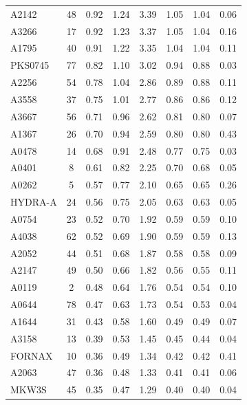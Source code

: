 \documentclass[10pt,aps,pra,reprint,amsmath,amsfonts,amssymb,showpacs,nofootinbib,floatfix]{revtex4-1}
\newcommand{\vstt}{\vspace{-0.0mm}}
\begin{document}
\begin{table}
\begin{minipage}{2.0\columnwidth}
\begin{tabular}{l c c c c c c c}
A2142    &  48 &   0.92 &   1.24 &   3.39 &   1.05 &   1.04 &   0.06 \vstt \\
A3266    &  17 &   0.92 &   1.23 &   3.37 &   1.05 &   1.04 &   0.16 \vstt \\
A1795    &  40 &   0.91 &   1.22 &   3.35 &   1.04 &   1.04 &   0.11 \vstt \\
PKS0745  &  77 &   0.82 &   1.10 &   3.02 &   0.94 &   0.88 &   0.03 \vstt \\
A2256    &  54 &   0.78 &   1.04 &   2.86 &   0.89 &   0.88 &   0.11 \vstt \\
A3558    &  37 &   0.75 &   1.01 &   2.77 &   0.86 &   0.86 &   0.12 \vstt \\
A3667    &  56 &   0.71 &   0.96 &   2.62 &   0.81 &   0.80 &   0.07 \vstt \\
A1367    &  26 &   0.70 &   0.94 &   2.59 &   0.80 &   0.80 &   0.43 \vstt \\
A0478    &  14 &   0.68 &   0.91 &   2.48 &   0.77 &   0.75 &   0.03 \vstt \\
A0401    &   8 &   0.61 &   0.82 &   2.25 &   0.70 &   0.68 &   0.05 \vstt \\
A0262    &   5 &   0.57 &   0.77 &   2.10 &   0.65 &   0.65 &   0.26 \vstt \\
HYDRA-A  &  24 &   0.56 &   0.75 &   2.05 &   0.63 &   0.63 &   0.05 \vstt \\
A0754    &  23 &   0.52 &   0.70 &   1.92 &   0.59 &   0.59 &   0.10 \vstt \\
A4038    &  62 &   0.52 &   0.69 &   1.90 &   0.59 &   0.59 &   0.13 \vstt \\
A2052    &  44 &   0.51 &   0.68 &   1.87 &   0.58 &   0.58 &   0.09 \vstt \\
A2147    &  49 &   0.50 &   0.66 &   1.82 &   0.56 &   0.55 &   0.11 \vstt \\
A0119    &   2 &   0.48 &   0.64 &   1.76 &   0.54 &   0.54 &   0.10 \vstt \\
A0644    &  78 &   0.47 &   0.63 &   1.73 &   0.54 &   0.53 &   0.04 \vstt \\
A1644    &  31 &   0.43 &   0.58 &   1.60 &   0.49 &   0.49 &   0.07 \vstt \\
A3158    &  13 &   0.39 &   0.53 &   1.45 &   0.45 &   0.44 &   0.04 \vstt \\
FORNAX   &  10 &   0.36 &   0.49 &   1.34 &   0.42 &   0.42 &   0.41 \vstt \\
A2063    &  47 &   0.36 &   0.48 &   1.33 &   0.41 &   0.41 &   0.06 \vstt \\
MKW3S    &  45 &   0.35 &   0.47 &   1.29 &   0.40 &   0.40 &   0.04 \vstt \\

\end{tabular}
\end{minipage}
\end{table}
\end{document}
